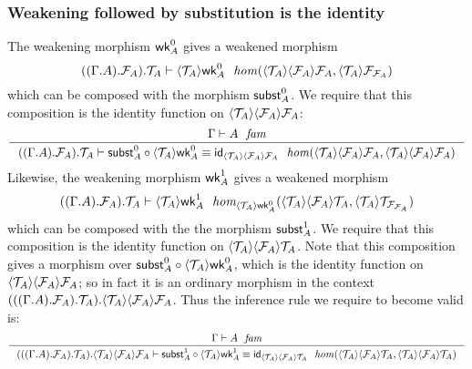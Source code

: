 \subsubsection{Weakening followed by substitution is the identity}
The weakening morphism $\tfwk{A}^0$ gives a weakened morphism
\begin{equation*}
\jhom
  {{{{\Gamma}{A}}{\mfam{A}}}{\mtm{A}}}
  {\ctxwk{\mtm{A}}{{\mfam{A}}{\mfam{A}}}}
  {\ctxwk{\mtm{A}}{\mfam{\mfam{A}}}}
  {\ctxwk{\mtm{A}}{\tfwk{A}^0}}
\end{equation*}
which can be composed with the morphism $\tfsubst{A}^0$. We require that this
composition is the identity function on $\ctxwk{\mtm{A}}{{\mfam{A}}{\mfam{A}}}$:
\begin{equation*}
\inference
  { \jfam{\Gamma}{A}
    }
  { \jhomeq
      {{{{\Gamma}{A}}{\mfam{A}}}{\mtm{A}}}
      {\ctxwk{\mtm{A}}{{\mfam{A}}{\mfam{A}}}}
      {\ctxwk{\mtm{A}}{{\mfam{A}}{\mfam{A}}}}
      {\jcomp{}{\ctxwk{\mtm{A}}{\tfwk{A}^0}}{\tfsubst{A}^0}}
      {\idfunc[\ctxwk{\mtm{A}}{{\mfam{A}}{\mfam{A}}}]}
    }
\end{equation*}
Likewise, the weakening morphism $\tfwk{A}^1$ gives a weakened morphism
\begin{equation*}
\jfhom
  {{{{\Gamma}{A}}{\mfam{A}}}{\mtm{A}}}
  {\ctxwk{\mtm{A}}{{\mfam{A}}{\mfam{A}}}}
  {\ctxwk{\mtm{A}}{\mfam{\mfam{A}}}}
  {\ctxwk{\mtm{A}}{\tfwk{A}^0}}
  {\ctxwk{\mtm{A}}{\ctxwk{\mfam{A}}{\mtm{A}}}}
  {\ctxwk{\mtm{A}}{\mtm{\mfam{\mfam{A}}}}}
  {\ctxwk{\mtm{A}}{\tfwk{A}^1}}
\end{equation*}
which can be composed with the the morphism $\tfsubst{A}^1$. We require that
this composition is the identity function on 
$\ctxwk{\mtm{A}}{\ctxwk{\mfam{A}}{\mtm{A}}}$. Note that this composition gives
a morphism over $\jcomp{}{\ctxwk{\mtm{A}}{\tfwk{A}^0}}{\tfsubst{A}^0}$, which
is the identity function on $\ctxwk{\mtm{A}}{{\mfam{A}}{\mfam{A}}}$; so in fact
it is an ordinary morphism in the context
$\ctxext{{{{\Gamma}{A}}{\mfam{A}}}{\mtm{A}}}{\ctxwk{\mtm{A}}{{\mfam{A}}{\mfam{A}}}}$.
Thus the inference rule we require to become valid is:
\begin{equation*}
\inference
  { \jfam{\Gamma}{A}
    }
  { \jhomeq
      {{{{{\Gamma}{A}}{\mfam{A}}}{\mtm{A}}}{\ctxwk{\mtm{A}}{{\mfam{A}}{\mfam{A}}}}}
      {\ctxwk{\mtm{A}}{\ctxwk{\mfam{A}}{\mtm{A}}}}
      {\ctxwk{\mtm{A}}{\ctxwk{\mfam{A}}{\mtm{A}}}}
      {\jcomp{}{\ctxwk{\mtm{A}}{\tfwk{A}^1}}{\tfsubst{A}^1}}
      {\idfunc[\ctxwk{\mtm{A}}{\ctxwk{\mfam{A}}{\mtm{A}}}]}
    }
\end{equation*}

